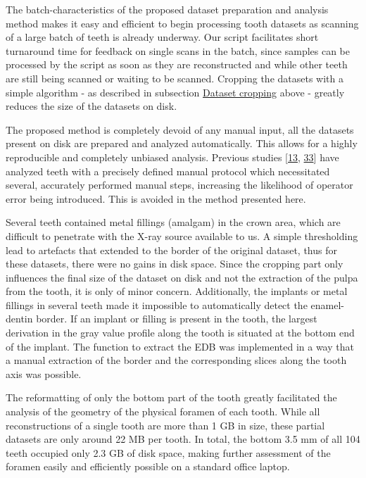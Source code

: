 \documentclass[
  american,
]{article}
\begin{document}
The batch-characteristics of the proposed dataset preparation and analysis method makes it easy and efficient to begin processing tooth datasets as scanning of a large batch of teeth is already underway.
Our script facilitates short turnaround time for feedback on single scans in the batch, since samples can be processed by the script as soon as they are reconstructed and while other teeth are still being scanned or waiting to be scanned.
Cropping the datasets with a simple algorithm - as described in subsection \protect\hyperlink{dataset-cropping}{Dataset cropping} above - greatly reduces the size of the datasets on disk.

The proposed method is completely devoid of any manual input, all the datasets present on disk are prepared and analyzed automatically.
This allows for a highly reproducible and completely unbiased analysis.
Previous studies {[}\protect\hyperlink{ref-19SVNdOdA}{13}, \protect\hyperlink{ref-jsWNcnau}{33}{]} have analyzed teeth with a precisely defined manual protocol which necessitated several, accurately performed manual steps, increasing the likelihood of operator error being introduced.
This is avoided in the method presented here.

Several teeth contained metal fillings (amalgam) in the crown area, which are difficult to penetrate with the X-ray source available to us.
A simple thresholding lead to artefacts that extended to the border of the original dataset, thus for these datasets, there were no gains in disk space.
Since the cropping part only influences the final size of the dataset on disk and not the extraction of the pulpa from the tooth, it is only of minor concern.
Additionally, the implants or metal fillings in several teeth made it impossible to automatically detect the enamel-dentin border.
If an implant or filling is present in the tooth, the largest derivation in the gray value profile along the tooth is situated at the bottom end of the implant.
The function to extract the EDB was implemented in a way that a manual extraction of the border and the corresponding slices along the tooth axis was possible.

The reformatting of only the bottom part of the tooth greatly facilitated the analysis of the geometry of the physical foramen of each tooth.
While all reconstructions of a single tooth are more than 1 GB in size, these partial datasets are only around 22 MB per tooth.
In total, the bottom 3.5 mm of all 104 teeth occupied only 2.3 GB of disk space, making further assessment of the foramen easily and efficiently possible on a standard office laptop.
\end{document}
